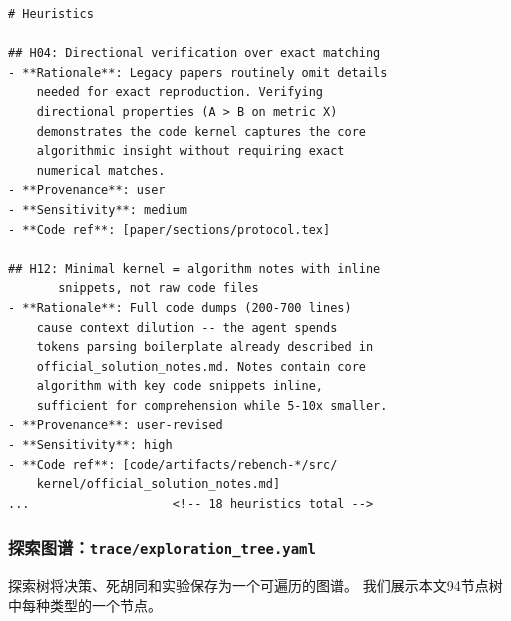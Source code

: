 \begin{lstlisting}[basicstyle=\ttfamily\scriptsize]
# Heuristics

## H04: Directional verification over exact matching
- **Rationale**: Legacy papers routinely omit details
    needed for exact reproduction. Verifying
    directional properties (A > B on metric X)
    demonstrates the code kernel captures the core
    algorithmic insight without requiring exact
    numerical matches.
- **Provenance**: user
- **Sensitivity**: medium
- **Code ref**: [paper/sections/protocol.tex]

## H12: Minimal kernel = algorithm notes with inline
       snippets, not raw code files
- **Rationale**: Full code dumps (200-700 lines)
    cause context dilution -- the agent spends
    tokens parsing boilerplate already described in
    official_solution_notes.md. Notes contain core
    algorithm with key code snippets inline,
    sufficient for comprehension while 5-10x smaller.
- **Provenance**: user-revised
- **Sensitivity**: high
- **Code ref**: [code/artifacts/rebench-*/src/
    kernel/official_solution_notes.md]
...                    <!-- 18 heuristics total -->
\end{lstlisting}

\subsubsection{探索图谱：\texttt{trace/exploration\_tree.yaml}}

探索树将决策、死胡同和实验保存为一个可遍历的图谱。
我们展示本文94节点树中每种类型的一个节点。

